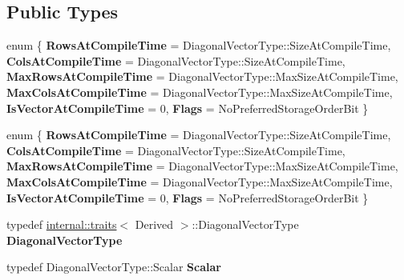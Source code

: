 \subsection*{Public Types}
\begin{DoxyCompactItemize}
\item 
\mbox{\label{class_eigen_1_1_diagonal_base_a1bc69fa3d39fcd95fe3852fc8d447906}} 
enum \{ \newline
{\bfseries Rows\+At\+Compile\+Time} = Diagonal\+Vector\+Type\+:\+:Size\+At\+Compile\+Time, 
{\bfseries Cols\+At\+Compile\+Time} = Diagonal\+Vector\+Type\+:\+:Size\+At\+Compile\+Time, 
{\bfseries Max\+Rows\+At\+Compile\+Time} = Diagonal\+Vector\+Type\+:\+:Max\+Size\+At\+Compile\+Time, 
{\bfseries Max\+Cols\+At\+Compile\+Time} = Diagonal\+Vector\+Type\+:\+:Max\+Size\+At\+Compile\+Time, 
\newline
{\bfseries Is\+Vector\+At\+Compile\+Time} = 0, 
{\bfseries Flags} = No\+Preferred\+Storage\+Order\+Bit
 \}
\item 
\mbox{\label{class_eigen_1_1_diagonal_base_aadb6b43053fa29f2ec0ccc662ffc4cbc}} 
enum \{ \newline
{\bfseries Rows\+At\+Compile\+Time} = Diagonal\+Vector\+Type\+:\+:Size\+At\+Compile\+Time, 
{\bfseries Cols\+At\+Compile\+Time} = Diagonal\+Vector\+Type\+:\+:Size\+At\+Compile\+Time, 
{\bfseries Max\+Rows\+At\+Compile\+Time} = Diagonal\+Vector\+Type\+:\+:Max\+Size\+At\+Compile\+Time, 
{\bfseries Max\+Cols\+At\+Compile\+Time} = Diagonal\+Vector\+Type\+:\+:Max\+Size\+At\+Compile\+Time, 
\newline
{\bfseries Is\+Vector\+At\+Compile\+Time} = 0, 
{\bfseries Flags} = No\+Preferred\+Storage\+Order\+Bit
 \}
\item 
\mbox{\label{class_eigen_1_1_diagonal_base_a1f8d7fbcf424eca7f639213484a2d51b}} 
typedef \hyperlink{struct_eigen_1_1internal_1_1traits}{internal\+::traits}$<$ Derived $>$\+::Diagonal\+Vector\+Type {\bfseries Diagonal\+Vector\+Type}
\item 
\mbox{\label{class_eigen_1_1_diagonal_base_a1e21c32c49ea8d2053c03dab3a2e698b}} 
typedef Diagonal\+Vector\+Type\+::\+Scalar {\bfseries Scalar}
\item 
\mbox{\label{class_eigen_1_1_diagonal_base_a8d046c4e1744039ba3bd8bcfdbc47fab}} 

\end{DoxyCompactItemize}
